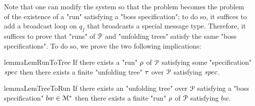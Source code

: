 Note that one can modify the system so that the \COVER problem becomes the problem of the existence of a "run" satisfying a "boss specification"; to do so, it suffices to add a broadcast loop on $q_f$ that broadcasts a special message type. Therefore, it suffices to prove that "runs" of $\mathcal{P}$ and "unfolding trees" satisfy the same "boss specifications". To do so, we prove the two following implications:

\begin{restatable}{lemma}{LemRunToTree}
	\label{lem:run-to-tree}
	If there exists a "run" $\rho$ of $\mathcal{P}$ satisfying some "specification" $\spec$ then there exists a finite "unfolding tree" $\tau$ over $\mathcal{P}$ satisfying $\spec$.
\end{restatable}

\begin{restatable}{lemma}{LemTreeToRun}
	\label{lem:tree-to-run}
	If there exists an "unfolding tree" over $\mathcal{P}$ satisfying a "boss specification" $bw \in \mathcal{M}^*$ then there exists a finite "run" $\rho$ of $\mathcal{P}$ satisfying $bw$.
\end{restatable}


	

